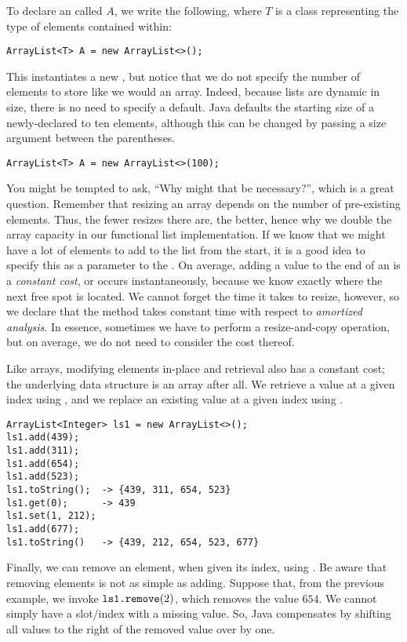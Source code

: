 To declare an  called $A$, we write the following, where $T$ is a class representing the type of elements contained within:
\begin{verbatim}
ArrayList<T> A = new ArrayList<>();
\end{verbatim}
This instantiates a new , but notice that we do not specify the number of elements to store like we would an array. Indeed, because lists are dynamic in size, there is no need to specify a default. Java defaults the starting size of a newly-declared  to ten elements, although this can be changed by passing a size argument between the parentheses.
\begin{verbatim}
ArrayList<T> A = new ArrayList<>(100);
\end{verbatim}
You might be tempted to ask, ``Why might that be necessary?'', which is a great question. Remember that resizing an array depends on the number of pre-existing elements. Thus, the fewer resizes there are, the better, hence why we double the array capacity in our functional list implementation. If we know that we might have a lot of elements to add to the list from the start, it is a good idea to specify this as a parameter to the . On average, adding a value to the end of an  is a \textit{constant cost}, or occurs instantaneously, because we know exactly where the next free spot is located. We cannot forget the time it takes to resize, however, so we declare that the  method takes constant time with respect to \textit{amortized analysis}. In essence, sometimes we have to perform a resize-and-copy operation, but on average, we do not need to consider the cost thereof.

Like arrays, modifying elements in-place and retrieval also has a constant cost; the underlying data structure is an array after all. We retrieve a value at a given index using , and we replace an existing value at a given index using .

\begin{verbatim}
ArrayList<Integer> ls1 = new ArrayList<>();
ls1.add(439);
ls1.add(311);
ls1.add(654);
ls1.add(523);
ls1.toString();  -> {439, 311, 654, 523}
ls1.get(0);      -> 439
ls1.set(1, 212);
ls1.add(677);
ls1.toString()   -> {439, 212, 654, 523, 677}
\end{verbatim}
Finally, we can remove an element, when given its index, using . Be aware that removing elements is not as simple as adding. Suppose that, from the previous example, we invoke $\texttt{ls1.remove}(2)$, which removes the value $654$. We cannot simply have a slot/index with a missing value. So, Java compensates by shifting all values to the right of the removed value over by one.

